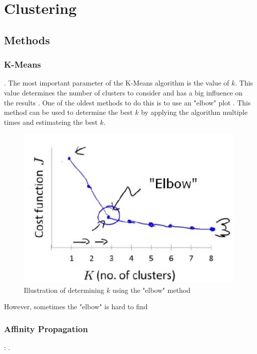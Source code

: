 \section{Clustering}

\subsection{Methods}
\subsubsection{K-Means} \label{theory:kmeans}
.
The most important parameter of the K-Means algorithm is the value of $k$.
This value determines the number of clusters to consider and has a big influence on the results \cite{ahmed_k-means_2020}.
One of the oldest methods to do this is to use an "elbow" plot \cite{kodinariya_review_2013}.
This method can be used to determine the best $k$ by applying the algorithm multiple times and estimateing the best $k$.
\begin{figure}[H]
  \includegraphics{TheorethicalFramework/dentification-of-Elbow-point.png}
  \caption{Illustration of determining $k$ using the "elbow" method \cite{kodinariya_review_2013}}
\end{figure}
However, sometimes the "elbow" is hard to find

\subsubsection{Affinity Propagation}:
.
